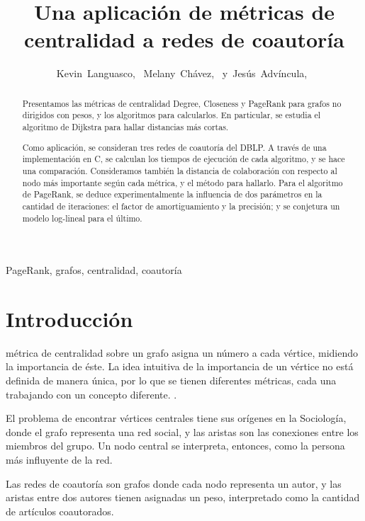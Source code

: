\documentclass[journal]{IEEEtran}
\begin{document}
\title{Una aplicación de métricas de centralidad a redes de coautoría}
\author{Kevin~Languasco,~
        Melany~Chávez,~
        y~Jesús~Advíncula,~%
}

\maketitle
\begin{abstract}
Presentamos las métricas de centralidad Degree, Closeness y PageRank para grafos no dirigidos con pesos, y los algoritmos para calcularlos. En particular, se estudia el algoritmo de Dijkstra para hallar distancias más cortas.

Como aplicación, se consideran tres redes de coautoría del DBLP\@. A través de una implementación en C, se calculan los tiempos de ejecución de cada algoritmo, y se hace una comparación. Consideramos también la distancia de colaboración con respecto al nodo más importante según cada métrica, y el método para hallarlo. Para el algoritmo de PageRank, se deduce experimentalmente la influencia de dos parámetros en la cantidad de iteraciones: el factor de amortiguamiento y la precisión; y se conjetura un modelo log-lineal para el último.
\end{abstract}
\begin{IEEEkeywords}
PageRank, grafos, centralidad, coautoría
\end{IEEEkeywords}
\IEEEpeerreviewmaketitle

\section{Introducción}
 métrica de centralidad sobre un grafo asigna un número a cada vértice, midiendo la importancia de éste. La idea intuitiva de la importancia de un vértice no está definida de manera única, por lo que se tienen diferentes métricas, cada una trabajando con un concepto diferente. \cite{brandes}.

El problema de encontrar vértices centrales tiene sus orígenes en la Sociología, donde el grafo representa una red social, y las aristas son las conexiones entre los miembros del grupo. Un nodo central se interpreta, entonces, como la persona más influyente de la red.

Las redes de coautoría son grafos donde cada nodo representa un autor, y las aristas entre dos autores tienen asignadas un peso, interpretado como la cantidad de artículos coautorados.
\end{document}
